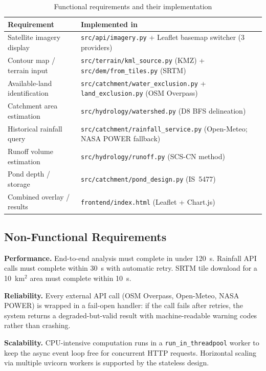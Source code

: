 \documentclass[manuscript,screen,review,nonacm]{acmart}
\begin{document}
\begin{table}[h]
  \caption{Functional requirements and their implementation}
  \label{tab:requirements}
  \begin{tabular}{p{3.6cm}p{3.6cm}}
    \toprule
    Requirement & Implemented in \\
    \midrule
    Satellite imagery display & \texttt{src/api/imagery.py} + Leaflet basemap switcher (3 providers) \\
    Contour map / terrain input & \texttt{src/terrain/kml\_source.py} (KMZ) + \texttt{src/dem/from\_tiles.py} (SRTM) \\
    Available-land identification & \texttt{src/catchment/water\_exclusion.py} + \texttt{land\_exclusion.py} (OSM Overpass) \\
    Catchment area estimation & \texttt{src/hydrology/watershed.py} (D8 BFS delineation) \\
    Historical rainfall query & \texttt{src/catchment/rainfall\_service.py} (Open-Meteo; NASA POWER fallback) \\
    Runoff volume estimation & \texttt{src/hydrology/runoff.py} (SCS-CN method) \\
    Pond depth / storage & \texttt{src/catchment/pond\_design.py} (IS~5477) \\
    Combined overlay / results & \texttt{frontend/index.html} (Leaflet + Chart.js) \\
    \bottomrule
  \end{tabular}
\end{table}

\subsection{Non-Functional Requirements}

\textbf{Performance.} End-to-end analysis must complete in under 120~s.
Rainfall API calls must complete within 30~s with automatic retry. SRTM
tile download for a 10~km$^2$ area must complete within 10~s.

\textbf{Reliability.} Every external API call (OSM Overpass, Open-Meteo,
NASA POWER) is wrapped in a fail-open handler: if the call fails after
retries, the system returns a degraded-but-valid result with
machine-readable warning codes rather than crashing.

\textbf{Scalability.} CPU-intensive computation runs in a
\texttt{run\_in\_threadpool} worker to keep the async event loop free for
concurrent HTTP requests. Horizontal scaling via multiple uvicorn workers
is supported by the stateless design.
\end{document}
